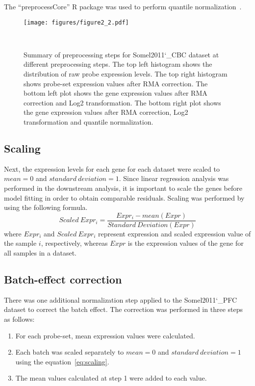 The ``preprocessCore'' R package was used to perform quantile normalization~\autocite{Bolstad2021}.

\begin{figure}[!ht]
\centering
\texttt{[image: figures/figure2\_2.pdf]}
\caption{Summary of preprocessing steps for Somel2011\char`_CBC dataset at different preprocessing steps. 
The top left histogram shows the distribution of raw probe expression levels. 
The top right histogram shows probe-set expression values after RMA correction. 
The bottom left plot shows the gene expression values after RMA correction and Log2 transformation.
The bottom right plot shows the gene expression values after RMA correction, Log2 transformation and quantile normalization.}~\label{fig:fig2.2}
\end{figure}

\subsection{Scaling}
Next, the expression levels for each gene for each dataset were scaled to $mean=0$ and $standard\ deviation=1$. 
Since linear regression analysis was performed in the downstream analysis, 
it is important to scale the genes before model fitting in order to obtain comparable residuals.
Scaling was performed by using the following formula.
\begin{equation}
    Scaled\ Expr_i = \frac{Expr_i - mean(Expr)}{Standard\ Deviation(Expr)}
    \label{eq:scaling}
\end{equation}
where $Expr_i$ and $Scaled\ Expr_i$ represent expression and scaled expression value of the sample $i$, respectively, 
whereas $Expr$ is the expression values of the gene for all samples in a dataset.

\subsection{Batch-effect correction}
There was one additional normalization step applied to the Somel2011\char`_PFC dataset to correct the batch effect.
The correction was performed in three steps as follows:

\begin{enumerate}
    \item For each probe-set, mean expression values were calculated.
    \item Each batch was scaled separately to $mean=0$ and $standard\ deviation=1$ using the equation~\ref{eq:scaling}.
    \item The mean values calculated at step 1 were added to each value.
\end{enumerate}

